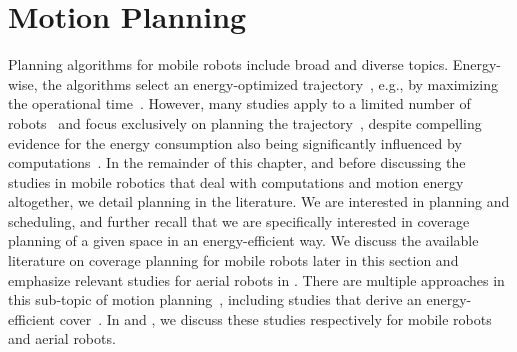 \section{Motion Planning}
\label{sec:soa-motion-pl}

Planning algorithms for mobile robots include broad and diverse topics. Energy-wise, the algorithms select an energy-optimized trajectory~\citep{mei2004energy}, e.g., by maximizing the operational time~\citep{wahab2015energy}. However, many studies apply to a limited number of robots~\citep{kim2005energy} and focus exclusively on planning the trajectory~\citep{kim2008minimum}, despite compelling evidence for the energy consumption also being significantly influenced by computations~\citep{ondruska2015scheduled,mei2005case}. 
In the remainder of this chapter, and before discussing the studies in mobile robotics that deal with computations and motion energy altogether, we detail planning in the literature. 
We are interested in planning and scheduling, and further recall that we are specifically interested in coverage planning of a given space in an energy-efficient way. We discuss the available literature on coverage planning for mobile robots later in this section and emphasize relevant studies for aerial robots in . There are multiple approaches in this sub-topic of motion planning~\citep{choset2001coverage,cabreira2019survey}, including studies that derive an energy-efficient cover~\citep{wei2018coverage,cabreira2018energy}. In  and , we discuss these studies respectively for mobile robots and aerial robots. 

